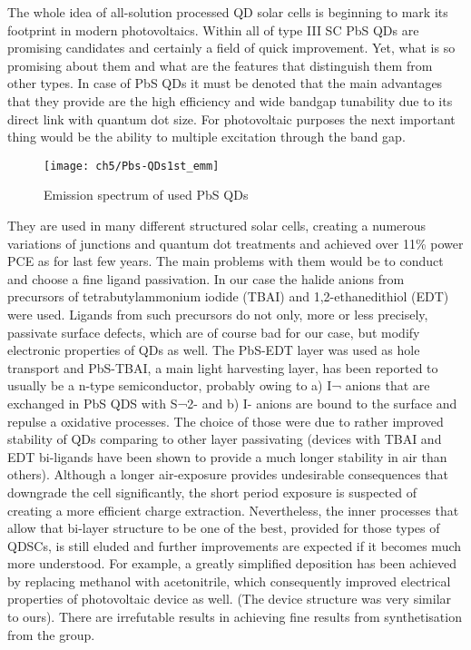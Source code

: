 

The whole idea of all-solution processed QD solar cells is beginning to mark its footprint in modern photovoltaics. Within all of type III SC PbS QDs are promising candidates and certainly a field of quick improvement. Yet, what is so promising about them and what are the features that distinguish them from other types. 
In case of PbS QDs it must be denoted that the main advantages that they provide are the high efficiency and wide bandgap tunability due to its direct link with quantum dot size. For photovoltaic purposes the next important thing would be the ability to multiple excitation through the band gap. 
\begin{wrapfigure}{l}{0.601\textwidth}
\center
\texttt{[image: ch5/Pbs-QDs1st\_emm]}
\caption{Emission spectrum of used PbS QDs \cite{2011}}
\end{wrapfigure}
They are used in many different structured solar cells, creating a numerous variations of junctions and quantum dot treatments and achieved over 11\% power PCE as for last few years. The main problems with them would be to conduct and choose a fine ligand passivation. In our case the halide anions from precursors of tetrabutylammonium iodide (TBAI) and 1,2-ethanedithiol (EDT) were used. Ligands from such precursors do not only, more or less precisely, passivate surface defects, which are of course bad for our case, but modify electronic properties of QDs as well. The PbS-EDT layer was used as hole transport and  PbS-TBAI, a main light harvesting layer,  has been reported to usually be a n-type semiconductor, probably owing to a) I¬  anions that are exchanged in PbS QDS with S¬2- and b) I- anions are bound to the surface and repulse a oxidative processes. The choice of those were due to rather improved stability of QDs comparing to other layer passivating (devices with TBAI and EDT bi-ligands have been shown to provide a much longer stability in air than others). Although a longer air-exposure provides undesirable consequences that downgrade the cell significantly, the short period exposure is suspected of creating a more efficient charge extraction. Nevertheless, the inner processes that allow that bi-layer structure to be one of the best, provided for those types of QDSCs, is still eluded and further improvements are expected if it becomes much more understood. For example, a greatly simplified deposition has been achieved by replacing methanol with acetonitrile, which consequently improved electrical properties of photovoltaic device as well. (The device structure was very similar to ours). There are irrefutable results in achieving fine results from synthetisation from the group.\cite{Wang2017} \cite{Hu2016}

